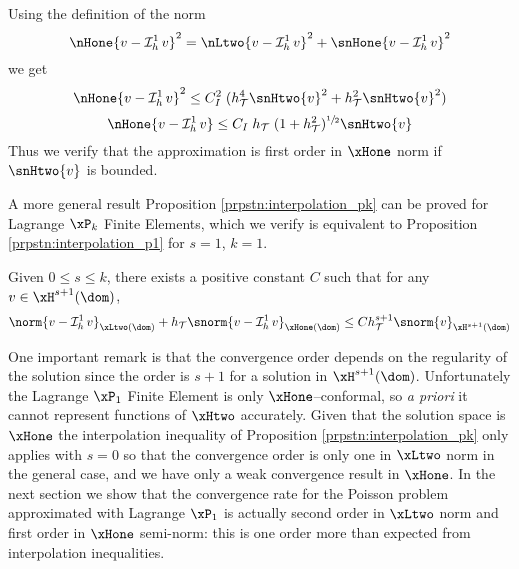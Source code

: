 \begin{rmrk}
Using the definition of the norm
\begin{equation*}
\nHone{v - \Lgrh{1} v}^2 = \nLtwo{v - \Lgrh{1} v}^2 + \snHone{v - \Lgrh{1} v}^2
\end{equation*}
we get
\begin{equation*}
\nHone{v - \Lgrh{1} v}^2 \leq C_I^2\; (\sizeT^4 \snHtwo{v}^2 + \sizeT^2 \snHtwo{v}^2)
\end{equation*}
\begin{equation*}
\nHone{v - \Lgrh{1} v} \leq C_I\; \sizeT\;(1 + \sizeT^2)^{\sfrac{1}{2}} \snHtwo{v}
\end{equation*}
Thus we verify that the approximation is first order in $\xHone$ norm if $\snHtwo{v}$ is bounded.
\end{rmrk}

A more general result Proposition \ref{prpstn:interpolation_pk} can be proved for Lagrange $\xP_k$ Finite Elements, which we verify is equivalent to Proposition \ref{prpstn:interpolation_p1} for $s=1$, $k=1$.

\begin{prpstn}\label{prpstn:interpolation_pk}
Given $0\leq s \leq k$, there exists a positive constant $C$ such that for any $v\in\xH^{s+1}(\dom)$,
\begin{equation*}
\norm{v-\Lgrh{1}v}_{\xLtwo(\dom)} + \sizeT \snorm{v-\Lgrh{1}v}_{\xHone(\dom)}\leq C \sizeT^{s+1}\snorm{v}_{\xH^{s+1}(\dom)}
\end{equation*}
\end{prpstn}

One important remark is that the convergence order depends on the regularity of the solution since the order is $s + 1$ for a solution in $\xH^{s+1}(\dom)$.
Unfortunately the Lagrange $\xPone$ Finite Element is only $\xHone$--conformal, so \textit{a priori} it cannot represent functions of $\xHtwo$ accurately.
Given that the solution space is $\xHone$ the interpolation inequality of Proposition \ref{prpstn:interpolation_pk} only applies with $s = 0$ so that the convergence order is only one in $\xLtwo$ norm in the general case, and we have only a weak convergence result in $\xHone$.
In the next section we show that the convergence rate for the Poisson problem approximated with Lagrange $\xPone$ is actually second order in $\xLtwo$ norm and first order in $\xHone$ semi-norm: this is one order more than expected from interpolation inequalities.

